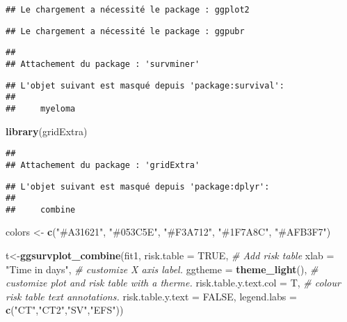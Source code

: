 \documentclass[
]{article}
\newenvironment{Shaded}{\begin{snugshade}}{\end{snugshade}}
\newcommand{\AttributeTok}[1]{\textcolor[rgb]{0.13,0.29,0.53}{#1}}
\newcommand{\CommentTok}[1]{\textcolor[rgb]{0.56,0.35,0.01}{\textit{#1}}}
\newcommand{\ConstantTok}[1]{\textcolor[rgb]{0.56,0.35,0.01}{#1}}
\newcommand{\FunctionTok}[1]{\textcolor[rgb]{0.13,0.29,0.53}{\textbf{#1}}}
\newcommand{\NormalTok}[1]{#1}
\newcommand{\OtherTok}[1]{\textcolor[rgb]{0.56,0.35,0.01}{#1}}
\newcommand{\StringTok}[1]{\textcolor[rgb]{0.31,0.60,0.02}{#1}}
\begin{document}
\begin{verbatim}
## Le chargement a nécessité le package : ggplot2
\end{verbatim}

\begin{verbatim}
## Le chargement a nécessité le package : ggpubr
\end{verbatim}

\begin{verbatim}
## 
## Attachement du package : 'survminer'
\end{verbatim}

\begin{verbatim}
## L'objet suivant est masqué depuis 'package:survival':
## 
##     myeloma
\end{verbatim}

\begin{Shaded}
\begin{Highlighting}[]
\FunctionTok{library}\NormalTok{(gridExtra)}
\end{Highlighting}
\end{Shaded}

\begin{verbatim}
## 
## Attachement du package : 'gridExtra'
\end{verbatim}

\begin{verbatim}
## L'objet suivant est masqué depuis 'package:dplyr':
## 
##     combine
\end{verbatim}

\begin{Shaded}
\begin{Highlighting}[]
\NormalTok{colors }\OtherTok{\textless{}{-}} \FunctionTok{c}\NormalTok{(}\StringTok{"\#A31621"}\NormalTok{, }\StringTok{"\#053C5E"}\NormalTok{, }\StringTok{"\#F3A712"}\NormalTok{, }\StringTok{"\#1F7A8C"}\NormalTok{, }\StringTok{"\#AFB3F7"}\NormalTok{)}

\NormalTok{t}\OtherTok{\textless{}{-}}\FunctionTok{ggsurvplot\_combine}\NormalTok{(fit1,}
          \AttributeTok{risk.table =} \ConstantTok{TRUE}\NormalTok{,                  }\CommentTok{\# Add risk table}
   \AttributeTok{xlab =} \StringTok{"Time in days"}\NormalTok{,   }\CommentTok{\# customize X axis label.}
   \AttributeTok{ggtheme =} \FunctionTok{theme\_light}\NormalTok{(), }\CommentTok{\# customize plot and risk table with a therme.}
 \AttributeTok{risk.table.y.text.col =}\NormalTok{ T, }\CommentTok{\# colour risk table text annotations.}
  \AttributeTok{risk.table.y.text =} \ConstantTok{FALSE}\NormalTok{,}
  \AttributeTok{legend.labs =} \FunctionTok{c}\NormalTok{(}\StringTok{"CT"}\NormalTok{,}\StringTok{"CT2"}\NormalTok{,}\StringTok{"SV"}\NormalTok{,}\StringTok{"EFS"}\NormalTok{))}
\end{Highlighting}
\end{Shaded}
\end{document}
